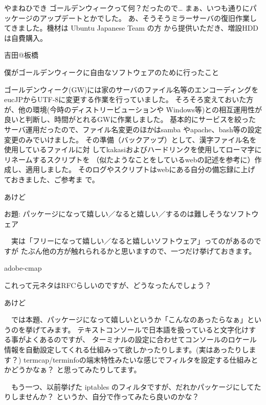 \documentclass[cjk,dvipdfmx,12pt]{beamer}
\begin{document}
\begin{frame}{やまねひでき}
ゴールデンウィークって何？だったので…
まぁ、いつも通りにパッケージのアップデートとかでした。
あ、そうそうミラーサーバの復旧作業してきました。機材は Ubuntu Japanese Team の方
から提供いただき、増設HDDは自費購入。

\end{frame}\begin{frame}{吉田@板橋}

僕がゴールデンウィークに自由なソフトウェアのために行ったこと

ゴールデンウィーク(GW)には家のサーバのファイル名等のエンコーディングを
eucJPからUTF-8に変更する作業を行っていました。
そろそろ変えておいた方が、他の環境(今時のディストリービューションや
Windows等)との相互運用性が良いと判断し、時間がとれるGWに作業しました。
基本的にサービスを絞ったサーバ運用だったので、ファイル名変更のほかはsamba
やapache、bash等の設定変更のみでいけました。
その準備（バックアップ）として、漢字ファイル名を使用しているファイルに対
してkakasiおよびハードリンクを使用してローマ字にリネームするスクリプトを
（似たようなことをしているwebの記述を参考に）作成し、適用しました。
そのログやスクリプトはwebにある自分の備忘録に上げておきました、ご参考ま
で。


\end{frame}\begin{frame}[containsverbatim]{あけど}

お題: パッケージになって嬉しい／なると嬉しい／するのは難しそうなソフトウェア

　実は「フリーになって嬉しい／なると嬉しいソフトウェア」ってのがあるのですが
たぶん他の方が触れられるかと思いますので、一つだけ挙げておきます。

\begin{commandline}
 adobe-cmap
\end{commandline}

これって元ネタはRFCらしいのですが、どうなったんでしょう？

\end{frame}\begin{frame}{あけど}

　では本題、パッケージになって嬉しいというか「こんなのあったらなぁ」というのを挙げてみます。
テキストコンソールで日本語を扱っていると文字化けする事がよくあるのですが、
ターミナルの設定に合わせてコンソールのロケール情報を自動設定してくれる仕組みって欲しかったりします。(実はあったりします？)
termcap/terminfoの端末特性みたいな感じでフィルタを設定する仕組みとかどうかなぁ？
と思ってみたりしてます。

　もう一つ、以前挙げた iptables のフィルタですが、だれかパッケージにしてたりしませんか？
というか、自分で作ってみたら良いのかな？


\end{frame}
\end{document}
